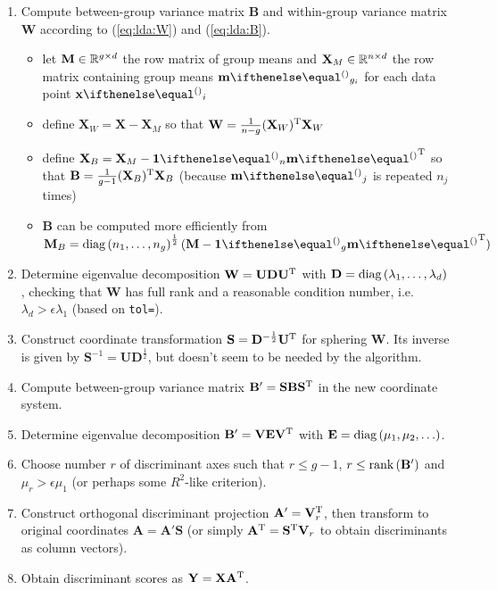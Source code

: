\documentclass[a4paper]{article}
\begin{document}
\begin{enumerate}
\item Compute between-group variance matrix $\mathbf{B}$ and within-group variance matrix $\mathbf{W}$ according to (\ref{eq:lda:W}) and (\ref{eq:lda:B}).
  \begin{itemize}
  \item let $\mathbf{M}\in \mathbb{R}^{g\times d}$ the row matrix of group means and $\mathbf{X}_M\in \mathbb{R}^{n\times d}$ the row matrix containing group means $\vm_{g_i}$ for each data point $\vx_i$
  \item define $\mathbf{X}_W = \mathbf{X} - \mathbf{X}_M$ so that $\mathbf{W} = \frac1{n - g} (\mathbf{X}_W)^{\text{T}} \mathbf{X}_W$
  \item define $\mathbf{X}_B = \mathbf{X}_M - \vone_n \vm\T$ so that $\mathbf{B} = \frac{1}{g - 1} (\mathbf{X}_B)^{\text{T}} \mathbf{X}_B$ (because $\vm_j$ is repeated $n_j$ times)
  \item $\mathbf{B}$ can be computed more efficiently from $\mathbf{M}_B = \Diag{n_1, \ldots, n_g}^{\frac12} (\mathbf{M} - \vone_g \vm\T)$
  \end{itemize}
\item Determine eigenvalue decomposition $\mathbf{W} = \mathbf{U} \mathbf{D} \mathbf{U}^{\text{T}}$ with $\mathbf{D} = \mathop{\text{diag}}\left(\lambda_1, \ldots, \lambda_d\right)$, checking that $\mathbf{W}$ has full rank and a reasonable condition number, i.e.\ $\lambda_d > \epsilon \lambda_1$ (based on \texttt{tol=}).
\item Construct coordinate transformation $\mathbf{S} = \mathbf{D}^{-\frac12} \mathbf{U}^{\text{T}}$ for sphering $\mathbf{W}$. Its inverse is given by $\mathbf{S}^{-1} = \mathbf{U} \mathbf{D}^{\frac12}$, but doesn't seem to be needed by the algorithm.
\item Compute between-group variance matrix $\mathbf{B}' = \mathbf{S} \mathbf{B} \mathbf{S}^{\text{T}}$ in the new coordinate system.
\item Determine eigenvalue decomposition $\mathbf{B}' = \mathbf{V} \mathbf{E} \mathbf{V}^{\text{T}}$ with $\mathbf{E} = \mathop{\text{diag}}\left(\mu_1, \mu_2, \ldots\right)$.
\item Choose number $r$ of discriminant axes such that $r\leq g-1$, $r\leq \mathop{\text{rank}}\left(\mathbf{B}'\right)$ and $\mu_r > \epsilon \mu_1$ (or perhaps some $R^2$-like criterion).
\item Construct orthogonal discriminant projection $\mathbf{A}' = \mathbf{V}_r^{\text{T}}$, then transform to original coordinates $\mathbf{A} = \mathbf{A}' \mathbf{S}$ (or simply $\mathbf{A}^{\text{T}} = \mathbf{S}^{\text{T}} \mathbf{V}_r$ to obtain discriminants as column vectors).
\item Obtain discriminant scores as $\mathbf{Y} = \mathbf{X} \mathbf{A}^{\text{T}}$.
\end{enumerate}
\end{document}
